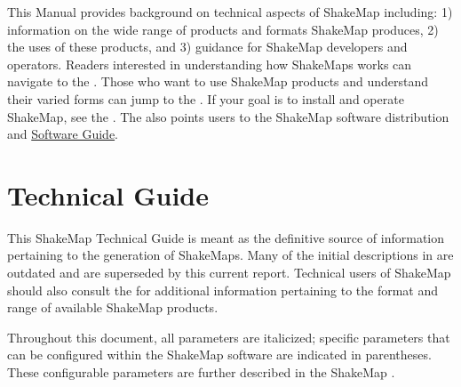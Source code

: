 \documentclass[letterpaper,10pt,english]{sphinxmanual}
\begin{document}
This Manual provides background on technical aspects of ShakeMap including: 1) information on
the wide range of products and formats ShakeMap produces, 2) the uses of these products,
and 3) guidance for
ShakeMap developers and operators. Readers interested in understanding how
ShakeMaps works can navigate to the {\hyperref[technical_guide:technical\string-guide]{}}. Those who want to use
ShakeMap products and understand their varied forms can jump to the {\hyperref[users_guide:users\string-guide]{}}.
If your goal is to install and operate ShakeMap, see the {\hyperref[software_guide:software\string-guide]{}}. The
{\hyperref[software_guide:software\string-guide]{}} also points users to the ShakeMap software distribution and
\href{http://usgs.github.io/shakemap/\_static/SoftwareGuideV3\_5.pdf}{Software Guide}.


\chapter{Technical Guide}
\label{technical_guide:technical-guide}\label{technical_guide:id1}\label{technical_guide::doc}
This ShakeMap Technical Guide is meant as the definitive source of information
pertaining to the generation of ShakeMaps.  Many of the initial descriptions in {\hyperref[references:wald1999a]{}} are outdated and are superseded by this current report.  Technical users of
ShakeMap should also consult the {\hyperref[users_guide:users\string-guide]{}} for additional information
pertaining to the format and range of available ShakeMap products.

Throughout this document, all parameters are italicized; specific parameters that can be configured within the
ShakeMap software are indicated in parentheses.  These configurable
parameters are further described in the ShakeMap {\hyperref[software_guide:sm35\string-software\string-guide]{}}.
\end{document}
